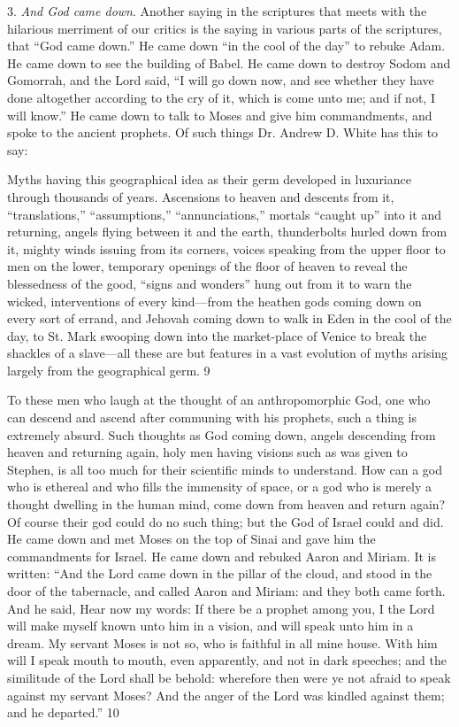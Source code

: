 3. \textit{And God came down}. Another saying in the scriptures that meets with the hilarious
merriment of our critics is the saying in various parts of the scriptures, that ``God came
down.'' He came down ``in the cool of the day'' to rebuke Adam. He came down to see the
building of Babel. He came down to destroy Sodom and Gomorrah, and the Lord said, ``I will
go down now, and see whether they have done altogether according to the cry of it, which is
come unto me; and if not, I will know.'' He came down to talk to Moses and give him
commandments, and spoke to the ancient prophets. Of such things Dr. Andrew D. White has
this to say:

Myths having this geographical idea as their germ developed in luxuriance through thousands
of years. Ascensions to heaven and descents from it, ``translations,'' ``assumptions,''
``annunciations,'' mortals ``caught up'' into it and returning, angels flying between it and the
earth, thunderbolts hurled down from it, mighty winds issuing from its corners, voices
speaking from the upper floor to men on the lower, temporary openings of the floor of
heaven to reveal the blessedness of the good, ``signs and wonders'' hung out from it to warn
the wicked, interventions of every kind—from the heathen gods coming down on every sort
of errand, and Jehovah coming down to walk in Eden in the cool of the day, to St. Mark
swooping down into the market-place of Venice to break the shackles of a slave—all these
are but features in a vast evolution of myths arising largely from the geographical germ. 9

To these men who laugh at the thought of an anthropomorphic God, one who can descend
and ascend after communing with his prophets, such a thing is extremely absurd. Such
thoughts as God coming down, angels descending from heaven and returning again, holy
men having visions such as was given to Stephen, is all too much for their scientific minds to
understand. How can a god who is ethereal and who fills the immensity of space, or a god
who is merely a thought dwelling in the human mind, come down from heaven and return
again? Of course their god could do no such thing; but the God of Israel could and did. He
came down and met Moses on the top of Sinai and gave him the commandments for Israel.
He came down and rebuked Aaron and Miriam. It is written: ``And the Lord came down in
the pillar of the cloud, and stood in the door of the tabernacle, and called Aaron and Miriam:
and they both came forth. And he said, Hear now my words: If there be a prophet among
you, I the Lord will make myself known unto him in a vision, and will speak unto him in a
dream. My servant Moses is not so, who is faithful in all mine house. With him will I speak
mouth to mouth, even apparently, and not in dark speeches; and the similitude of the Lord
shall be behold: wherefore then were ye not afraid to speak against my servant Moses? And
the anger of the Lord was kindled against them; and he departed.'' 10

